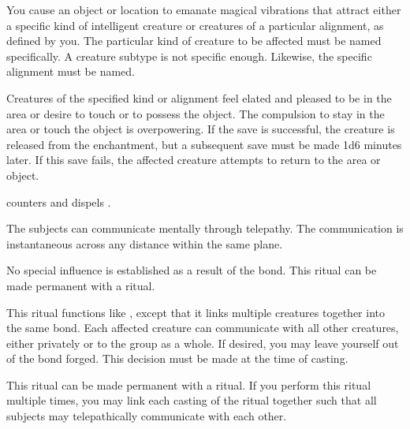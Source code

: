 \spellrng{\rngclose}
\begin{spelleffect}
You cause an object or location to emanate magical vibrations that attract either a specific kind of intelligent creature or creatures of a particular alignment, as defined by you. The particular kind of creature to be affected must be named specifically. A creature subtype is not specific enough. Likewise, the specific alignment must be named.
\par Creatures of the specified kind or alignment feel elated and pleased to be in the area or desire to touch or to possess the object. The compulsion to stay in the area or touch the object is overpowering. If the save is successful, the creature is released from the enchantment, but a subsequent save must be made 1d6 minutes later. If this save fails, the affected creature attempts to return to the area or object.
\end{spelleffect}
\begin{spellnotes}
 counters and dispels .
\end{spellnotes}

\spellrng{\rngclose}
\begin{spelleffect}
  The subjects can communicate mentally through telepathy. The communication is instantaneous across any distance within the same plane.
\end{spelleffect}
\begin{spellnotes}
  No special influence is established as a result of the bond. This ritual can be made permanent with a  ritual.
\end{spellnotes}

\begin{spelleffect}
  This ritual functions like , except that it links multiple creatures together into the same bond. Each affected creature can communicate with all other creatures, either privately or to the group as a whole. If desired, you may leave yourself out of the bond forged. This decision must be made at the time of casting.
\end{spelleffect}
\begin{spellnotes}
This ritual can be made permanent with a  ritual. If you perform this ritual multiple times, you may link each casting of the ritual together such that all subjects may telepathically communicate with each other. 
\end{spellnotes}

